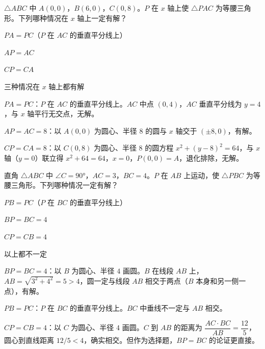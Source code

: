 \documentclass{exam-zh}
\begin{document}
\begin{question}[points=3]
  $\triangle ABC$ 中 $A(0,0)$，$B(6,0)$，$C(0,8)$。$P$ 在 $x$ 轴上使 $\triangle PAC$ 为等腰三角形。下列哪种情况在 $x$ 轴上一定有解？
  \begin{choices}
    \item $PA = PC$（$P$ 在 $AC$ 的垂直平分线上）
    \item $AP = AC$
    \item $CP = CA$
    \item 三种情况在 $x$ 轴上都有解
  \end{choices}
  \paren[B]
  \begin{solutionblock}
    $PA=PC$：$P$ 在 $AC$ 的垂直平分线上。$AC$ 中点 $(0,4)$，$AC$ 垂直平分线为 $y=4$，与 $x$ 轴平行无交点，无解。

$AP=AC=8$：以 $A(0,0)$ 为圆心、半径 $8$ 的圆与 $x$ 轴交于 $(\pm 8,0)$，有解。

$CP=CA=8$：以 $C(0,8)$ 为圆心、半径 $8$ 的圆方程 $x^2+(y-8)^2=64$，与 $x$ 轴（$y=0$）联立得 $x^2+64=64$，$x=0$，$P(0,0)=A$，退化排除，无解。
  \end{solutionblock}
\end{question}



\begin{question}[points=3]
  直角 $\triangle ABC$ 中 $\angle C = 90°$，$AC=3$，$BC=4$。$P$ 在 $AB$ 上运动，使 $\triangle PBC$ 为等腰三角形。下列哪种情况一定有解？
  \begin{choices}
    \item $PB=PC$（$P$ 在 $BC$ 的垂直平分线上）
    \item $BP=BC=4$
    \item $CP=CB=4$
    \item 以上都不一定
  \end{choices}
  \paren[B]
  \begin{solutionblock}
    $BP=BC=4$：以 $B$ 为圆心、半径 $4$ 画圆。$B$ 在线段 $AB$ 上，$AB=\sqrt{3^2+4^2}=5>4$，圆一定与线段 $AB$ 相交于两点（$B$ 本身和另一侧一点），有解。

$PB=PC$：$P$ 在 $BC$ 的垂直平分线上。$BC$ 中垂线不一定与 $AB$ 相交。

$CP=CB=4$：以 $C$ 为圆心、半径 $4$ 画圆。$C$ 到 $AB$ 的距离为 $\dfrac{AC\cdot BC}{AB}=\dfrac{12}{5}$，圆心到直线距离 $12/5 < 4$，确实相交。但作为选择题，$BP=BC$ 的论证更直接。
  \end{solutionblock}
\end{question}
\end{document}
